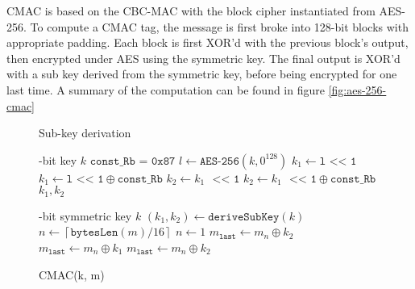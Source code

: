 \documentclass[journal=tches,submission]{iacrtrans}
\begin{document}
CMAC is based on the CBC-MAC with the block cipher instantiated from AES-256. To compute a CMAC tag, the message is first broke into 128-bit blocks with appropriate padding. Each block is first XOR'd with the previous block's output, then encrypted under AES using the symmetric key. The final output is XOR'd with a sub key derived from the symmetric key, before being encrypted for one last time. A summary of the computation can be found in figure \ref{fig:aes-256-cmac}

\begin{figure}[h]
    \centering
    \begin{minipage}[t]{0.49\textwidth}
        \begin{algorithm}[H]
            \caption*{Sub-key derivation}
            \begin{algorithmic}[1]
                -bit key $k$
                \Require $\texttt{const\_Rb = 0x87}$
                \State $l \leftarrow \texttt{AES-256}(k, 0^{128})$
                    \State $k_1 \leftarrow \texttt{l {<}{<} 1}$
                \Else 
                    \State $k_1 \leftarrow \texttt{l {<}{<} 1} \oplus \texttt{const\_Rb}$
                \EndIf
                    \State $k_2 \leftarrow k_1 \texttt{ {<}{<} 1}$
                \Else 
                    \State $k_2 \leftarrow k_1 \texttt{ {<}{<} 1} \oplus \texttt{const\_Rb}$
                \EndIf
                \State \Return $k_1, k_2$
            \end{algorithmic}
        \end{algorithm}
    \end{minipage}\hfill
    \begin{minipage}[t]{0.49\textwidth}
        \begin{algorithm}[H]
            \caption*{CMAC(k, m)}
            \begin{algorithmic}[1]
                -bit symmetric key $k$
                \State $(k_1, k_2) \leftarrow \texttt{deriveSubKey}(k)$
                \State $n \leftarrow \left\lceil \texttt{bytesLen}(m) / 16\right\rceil$
                    \State $n \leftarrow 1$
                    \State $m_\texttt{last} \leftarrow m_n \oplus k_2$
                    \State $m_\texttt{last} \leftarrow m_n \oplus k_1$
                \Else 
                    \State $m_\texttt{last} \leftarrow m_n \oplus k_2$
                \EndIf


\end{algorithmic}
\end{algorithm}
\end{minipage}
\end{figure}
\end{document}
